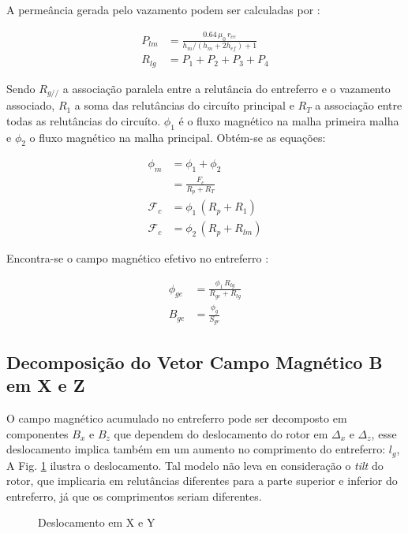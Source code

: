A permeância gerada pelo vazamento podem ser calculadas por \citep{Leupold1996a}  : 

\begin{align}
P_{lm} &= \frac{0.64 \,  \mu_0 \,r_{ee}}{h_m/(h_m+2h_{ef})+1} \\
R_{lg} &= P_1 + P_2 + P_3 + P_4	
\end{align} 

Sendo $R_{g//}$ a associação paralela entre a relutância do entreferro e o vazamento associado, $R_1$ a soma das relutâncias do circuíto principal e $R_T$ a associação entre todas as relutâncias do circuíto. $\phi_1$ é o fluxo magnético na malha primeira malha e $\phi_2$ o fluxo magnético na malha principal. Obtém-se as equações:

\begin{align}
\phi_m &= \phi_1 + \phi_2 \\
&= \frac{F_c}{R_p + R_T} \\
\mathcal{F}_c	 &= \phi_1 \, (R_p + R_1) \\
\mathcal{F}_c    &= \phi_2 \, (R_p + R_{lm})
\end{align}

Encontra-se o campo magnético efetivo no entreferro :

\begin{align}
\phi_{ge} &= \frac{\phi_1 \, R_{lg}}{R_{ge}+R_{lg}} \\
B_{ge} &= \frac{\phi_g}{S_{ge}}
\end{align}


\subsection{Decomposição do Vetor Campo Magnético B em X e Z} \label{SubSec:CampoX/Y}

O campo magnético acumulado no entreferro pode ser decomposto em componentes $B_x$ e $B_z$ que dependem do deslocamento do rotor em $\Delta_x$ e $\Delta_z$, esse deslocamento implica também em um aumento no comprimento do entreferro: $l_g$, A Fig. \ref{Fig:modelo:passivo:DxDz} ilustra o deslocamento. Tal modelo não leva en consideração o \textit{tilt} do rotor, que implicaria em relutâncias diferentes para a parte superior e inferior do entreferro, já que os comprimentos seriam diferentes. 

\begin{figure}[!ht]
	\centering
	\def\svgwidth{0.6\columnwidth}
	
	\caption{Deslocamento em X e Y}
	\label{Fig:modelo:passivo:DxDz}
\end{figure}

